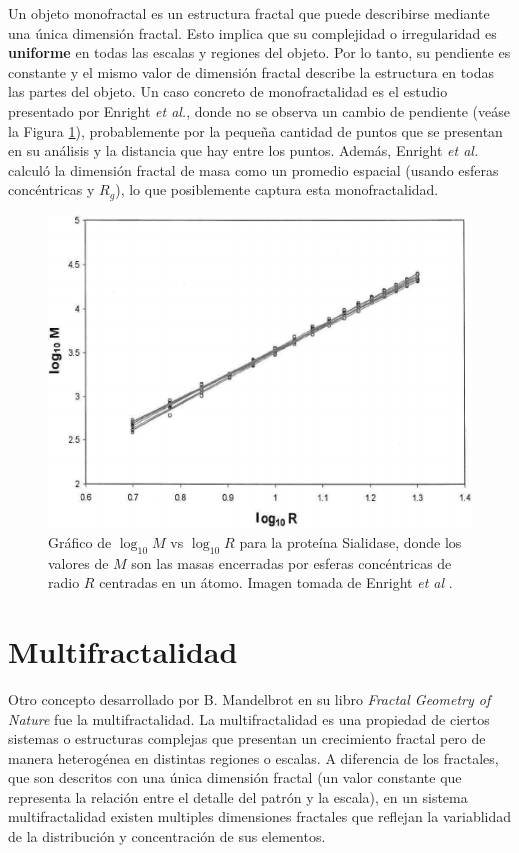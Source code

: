 Un objeto monofractal es un estructura fractal que puede describirse mediante una \'{u}nica dimensi\'{o}n fractal. Esto implica que su complejidad o irregularidad es \textbf{uniforme} en todas las escalas y regiones del objeto. Por lo tanto, su pendiente es constante y el mismo valor de dimensi\'{o}n fractal describe la estructura en todas las partes del objeto. Un caso concreto de monofractalidad es el estudio presentado por Enright \textit{et al.}\cite{Enright2005}, donde no se observa un cambio de pendiente (ve\'{a}se la Figura \ref{fig:Enright-Fractal}), probablemente por la pequeña cantidad de puntos que se presentan en su an\'{a}lisis y la distancia que hay entre los puntos. Adem\'{a}s, Enright \textit{et al.} calcul\'{o} la dimensi\'{o}n fractal de masa como un promedio espacial (usando esferas conc\'{e}ntricas y $R_g$), lo que posiblemente captura esta monofractalidad.

\begin{figure}[H]
	\begin{center}
		\includegraphics[width=0.6\linewidth]{graphs/Enright2005}
		\caption{Gr\'{a}fico de $\log_{10}M$ vs $\log_{10}R$ para la prote\'{i}na Sialidase, donde los valores de $M$ son las masas encerradas por esferas conc\'{e}ntricas de radio $R$ centradas en un \'{a}tomo. Imagen tomada de Enright \textit{et al} \cite{Enright2005}.}
		\label{fig:Enright-Fractal}
	\end{center}
\end{figure}

\section{Multifractalidad}

Otro concepto desarrollado por B. Mandelbrot en su libro \textit{Fractal Geometry of Nature} fue la multifractalidad. La multifractalidad es una propiedad de ciertos sistemas o estructuras complejas que presentan un crecimiento fractal pero de manera heterog\'{e}nea en distintas regiones o escalas. A diferencia de los fractales, que son descritos con una \'{u}nica dimensi\'{o}n fractal (un valor constante que representa la relaci\'{o}n entre el detalle del patr\'{o}n y la escala), en un sistema multifractalidad existen multiples dimensiones fractales que reflejan la variablidad de la distribuci\'{o}n y concentraci\'{o}n de sus elementos. 

